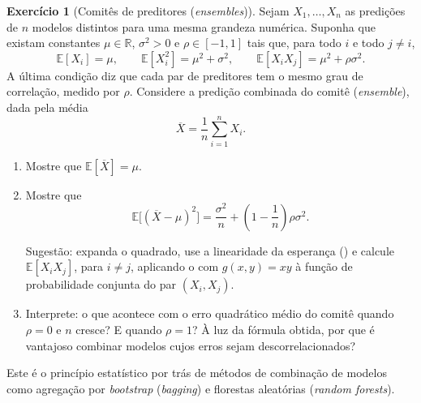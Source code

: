 \documentclass[12pt,portuguese]{article}
\theoremstyle{definition}
\newtheorem{exercise}{Exercício}
\begin{document}
\begin{exercise}[Comitês de preditores (\emph{ensembles})]\label{exercise:ensemble-preditores}
Sejam $X_1,\ldots,X_n$ as predições de $n$ modelos distintos para uma mesma
grandeza numérica. Suponha que existam constantes $\mu\in\mathbb{R}$,
$\sigma^2>0$ e $\rho\in[-1,1]$ tais que, para todo $i$ e todo $j\neq i$,
\[
\mathbb{E}[X_i]=\mu,
\qquad
\mathbb{E}[X_i^2]=\mu^2+\sigma^2,
\qquad
\mathbb{E}[X_iX_j]=\mu^2+\rho\sigma^2.
\]
A última condição diz que cada par de preditores tem o mesmo grau de correlação,
medido por $\rho$. Considere a predição combinada do comitê (\emph{ensemble}),
dada pela média
\[
\overline{X}=\frac{1}{n}\sum_{i=1}^n X_i.
\]
\begin{enumerate}[label=(\alph*)]
\item Mostre que $\mathbb{E}[\overline{X}]=\mu$.

\item Mostre que
\[
\mathbb{E}\bigl[(\overline{X}-\mu)^2\bigr]
=\frac{\sigma^2}{n}+\left(1-\frac{1}{n}\right)\rho\sigma^2.
\]

Sugestão: expanda o quadrado, use a linearidade da esperança
() e calcule $\mathbb{E}[X_iX_j]$, para $i\neq
j$, aplicando o  com $g(x,y)=xy$ à função de
probabilidade conjunta do par $(X_i,X_j)$.

\item Interprete: o que acontece com o erro quadrático médio do comitê quando
$\rho=0$ e $n$ cresce? E quando $\rho=1$? À luz da fórmula obtida, por que é
vantajoso combinar modelos cujos erros sejam descorrelacionados?
\end{enumerate}
Este é o princípio estatístico por trás de métodos de combinação de modelos
como agregação por \emph{bootstrap} (\emph{bagging}) e florestas aleatórias
(\emph{random forests}).
\end{exercise}



\end{document}
